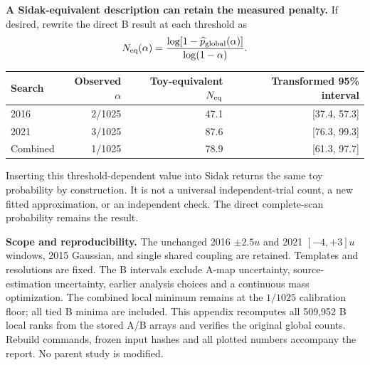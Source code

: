 \documentclass[11pt]{article}
\begin{document}
\textbf{A Sidak-equivalent description can retain the measured penalty.} If desired, rewrite the direct B result at each threshold as
\[
 N_{\rm eq}(\alpha)=\frac{\log[1-\widehat p_{\rm global}(\alpha)]}{\log(1-\alpha)}.
\]
\begin{center}\small\begin{tabular}{lrrr}\toprule
Search & Observed $\alpha$ & Toy-equivalent $N_{\rm eq}$ & Transformed 95\% interval\\\midrule
2016 & 2/1025 & 47.1 & [37.4, 57.3]\\
2021 & 3/1025 & 87.6 & [76.3, 99.3]\\
Combined & 1/1025 & 78.9 & [61.3, 97.7]\\
\bottomrule\end{tabular}\end{center}
Inserting this threshold-dependent value into Sidak returns the same toy probability by construction. It is not a universal independent-trial count, a new fitted approximation, or an independent check. The direct complete-scan probability remains the result.

\textbf{Scope and reproducibility.} The unchanged 2016 $\pm2.5u$ and 2021 $[-4,+3]u$ windows, 2015 Gaussian, and single shared coupling are retained. Templates and resolutions are fixed. The B intervals exclude A-map uncertainty, source-estimation uncertainty, earlier analysis choices and a continuous mass optimization. The combined local minimum remains at the $1/1025$ calibration floor; all tied B minima are included. This appendix recomputes all 509,952 B local ranks from the stored A/B arrays and verifies the original global counts. Rebuild commands, frozen input hashes and all plotted numbers accompany the report. No parent study is modified.
\end{document}
